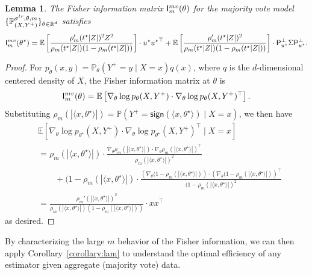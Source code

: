 \documentclass[11pt]{article}
\newcommand{\E}{\mathbb{E}}
\newcommand{\Prb}{\mathbb{P}}
\newcommand{\R}{\mathbb{R}} %
\renewcommand{\P}{\mathbb{P}}
\newcommand{\prn}[1]{\left({#1}\right)} %
\newcommand{\brk}[1]{\left[{#1}\right]} %
\newcommand{\majY}{Y^+}
\newcommand{\sgn}{\mathsf{sign}}
\newcommand{\lr}{^{\textup{lr}}}
\newcommand{\proj}{\mathsf{P}}
\newcommand{\<}{\langle} %
\renewcommand{\>}{\rangle}
\newcommand{\opt}{^\star}
\newtheorem{lemma}[claim]{Lemma}
\begin{document}
\begin{lemma}
  \label{lem:fisher-information-decomposition}
  The Fisher information matrix $\fishermv_m(\theta)$ for the majority vote
  model $\{\P_{(X,\majY)}^{\sigma\lr, \theta, m}\}_{\theta \in
    \R^d}$ satisfies
  \begin{align*}
    \fishermv_m(\theta\opt) = \E \brk{\frac{\rho_m'(t\opt|Z|)^2
        Z^2}{\rho_m(t\opt|Z|) ( 1 - \rho_m(t\opt|Z|))}} \cdot u\opt
             {u\opt}^\top + \E \brk{\frac{\rho_m'(t\opt|Z|)^2
               }{\rho_m(t\opt|Z|) ( 1 - \rho_m(t\opt|Z|))}} \cdot
             \proj_{u\opt}^\perp \Sigma \proj_{u\opt}^\perp .
  \end{align*}
\end{lemma}
\begin{proof}
  For $p_\theta(x, y) = \Prb_\theta(\majY = y \mid X = x) q(x)$, where
  $q$ is the $d$-dimensional centered density of $X$,
  the Fisher information matrix at $\theta$ is
  \begin{align*}
    \fishermv_m(\theta) = \E \brk{\nabla_\theta \log p_\theta(X, \majY) \cdot \nabla_\theta \log p_\theta(X, \majY)^\top }.
  \end{align*}
  Substituting $\rho_m(|\<x, \theta^\star\>|) = \Prb(\majY =
  \sgn(\<x, \theta^\star\>) \mid X = x)$, we then have
	\begin{align*}
		& \E \brk{\nabla_\theta \log p_{\theta\opt}(X, \majY) \cdot  \nabla_\theta \log p_{\theta\opt}(X, \majY)^\top \mid X = x } \\
		& =  \rho_m(|\<x, \theta^\star\>|) \cdot \frac{\nabla_\theta \rho_m(|\<x, \theta^\star\>|) \cdot \nabla_\theta \rho_m(|\<x, \theta^\star\>|)^\top}{\rho_m(|\<x, \theta^\star\>|)^2} \nonumber \\
		& \qquad + (1- \rho_m(|\<x, \theta^\star\>|) \cdot \frac{\prn{\nabla_\theta(1 - \rho_m(|\<x, \theta^\star\>|)} \cdot \prn{\nabla_\theta(1 - \rho_m(|\<x, \theta^\star\>|)}^\top}{(1 - \rho_m(|\<x, \theta^\star\>|)^2} \nonumber \\
		& = \frac{\rho_m'(|\<x, \theta^\star\>|)^2}{\rho_m(|\<x, \theta^\star\>|) ( 1 - \rho_m(|\<x, \theta^\star\>|))} \cdot xx^\top
	\end{align*}
        as desired.
\end{proof}

By characterizing the large $m$ behavior of the Fisher information,
we can then apply Corollary~\ref{corollary:lam} to understand
the optimal efficiency of any estimator given aggregate (majority vote)
data. 
\end{document}

